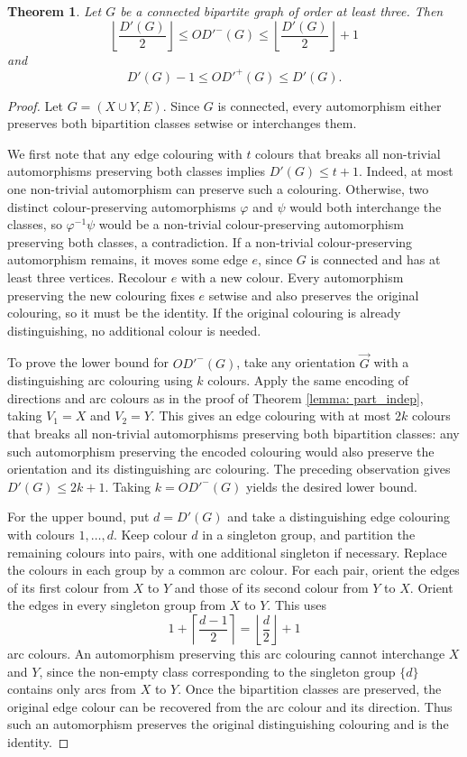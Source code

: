 \documentclass[10pt,a4paper]{amsart}
\newtheorem{theorem}{Theorem}
\newcommand{\orG}{\ensuremath{\overrightarrow{G}}}
\begin{document}
\begin{theorem} \label{thm: bipartite_bounds}
Let $G$ be a connected bipartite graph of order at least three. Then
\[
\left\lfloor\frac{D'(G)}{2}\right\rfloor
\leq OD'^-(G)
\leq \left\lfloor\frac{D'(G)}{2}\right\rfloor+1
\]
and
\[
D'(G)-1\leq OD'^+(G)\leq D'(G).
\]
\end{theorem}

\begin{proof}
Let $G=(X\cup Y,E)$. Since $G$ is connected, every automorphism either preserves both bipartition classes setwise or interchanges them.

We first note that any edge colouring with $t$ colours that breaks all non-trivial automorphisms preserving both classes implies $D'(G)\leq t+1$. Indeed, at most one non-trivial automorphism can preserve such a colouring. Otherwise, two distinct colour-preserving automorphisms $\varphi$ and $\psi$ would both interchange the classes, so $\varphi^{-1}\psi$ would be a non-trivial colour-preserving automorphism preserving both classes, a contradiction. If a non-trivial colour-preserving automorphism remains, it moves some edge $e$, since $G$ is connected and has at least three vertices. Recolour $e$ with a new colour. Every automorphism preserving the new colouring fixes $e$ setwise and also preserves the original colouring, so it must be the identity. If the original colouring is already distinguishing, no additional colour is needed.

To prove the lower bound for $OD'^-(G)$, take any orientation $\orG$ with a distinguishing arc colouring using $k$ colours. Apply the same encoding of directions and arc colours as in the proof of Theorem \ref{lemma: part_indep}, taking $V_1=X$ and $V_2=Y$. This gives an edge colouring with at most $2k$ colours that breaks all non-trivial automorphisms preserving both bipartition classes: any such automorphism preserving the encoded colouring would also preserve the orientation and its distinguishing arc colouring. The preceding observation gives $D'(G)\leq 2k+1$. Taking $k=OD'^-(G)$ yields the desired lower bound.

For the upper bound, put $d=D'(G)$ and take a distinguishing edge colouring with colours $1,\ldots,d$. Keep colour $d$ in a singleton group, and partition the remaining colours into pairs, with one additional singleton if necessary. Replace the colours in each group by a common arc colour. For each pair, orient the edges of its first colour from $X$ to $Y$ and those of its second colour from $Y$ to $X$. Orient the edges in every singleton group from $X$ to $Y$. This uses
\[
1+\left\lceil\frac{d-1}{2}\right\rceil
=\left\lfloor\frac{d}{2}\right\rfloor+1
\]
arc colours. An automorphism preserving this arc colouring cannot interchange $X$ and $Y$, since the non-empty class corresponding to the singleton group $\{d\}$ contains only arcs from $X$ to $Y$. Once the bipartition classes are preserved, the original edge colour can be recovered from the arc colour and its direction. Thus such an automorphism preserves the original distinguishing colouring and is the identity.


\end{proof}
\end{document}
